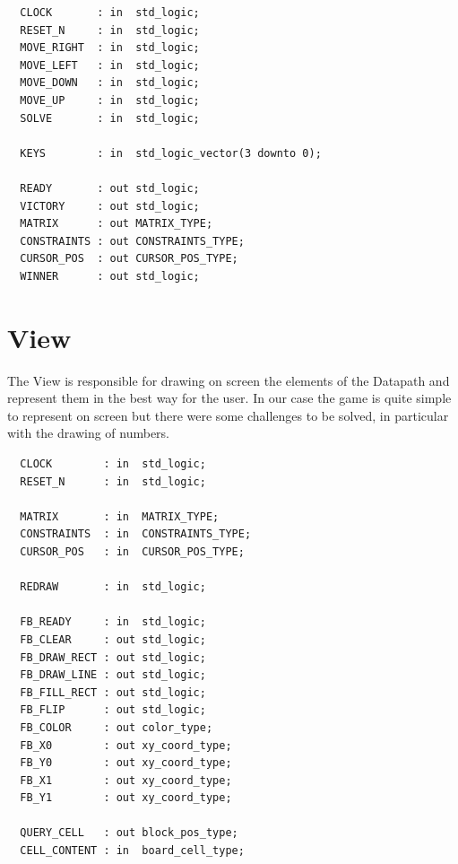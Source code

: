 \documentclass[12pt]{report}
\begin{document}
\begin{center}
\begin{minipage}{0.5\textwidth}
\begin{verbatim}
  CLOCK       : in  std_logic;
  RESET_N     : in  std_logic;
  MOVE_RIGHT  : in  std_logic;
  MOVE_LEFT   : in  std_logic;
  MOVE_DOWN   : in  std_logic;
  MOVE_UP     : in  std_logic;
  SOLVE       : in  std_logic;

  KEYS        : in  std_logic_vector(3 downto 0);

  READY       : out std_logic;
  VICTORY     : out std_logic;
  MATRIX      : out MATRIX_TYPE;
  CONSTRAINTS : out CONSTRAINTS_TYPE;
  CURSOR_POS  : out CURSOR_POS_TYPE;
  WINNER      : out std_logic;
\end{verbatim}
\end{minipage}
\end{center}

\newpage

\section*{View}

The View is responsible for drawing on screen the elements of the Datapath
and represent them in the best way for the user. In our case the game is
quite simple to represent on screen but there were some challenges to be
solved, in particular with the drawing of numbers.

\begin{center}
\begin{minipage}{0.5\textwidth}
\begin{verbatim}
  CLOCK        : in  std_logic;
  RESET_N      : in  std_logic;

  MATRIX       : in  MATRIX_TYPE;
  CONSTRAINTS  : in  CONSTRAINTS_TYPE;
  CURSOR_POS   : in  CURSOR_POS_TYPE;

  REDRAW       : in  std_logic;

  FB_READY     : in  std_logic;
  FB_CLEAR     : out std_logic;
  FB_DRAW_RECT : out std_logic;
  FB_DRAW_LINE : out std_logic;
  FB_FILL_RECT : out std_logic;
  FB_FLIP      : out std_logic;
  FB_COLOR     : out color_type;
  FB_X0        : out xy_coord_type;
  FB_Y0        : out xy_coord_type;
  FB_X1        : out xy_coord_type;
  FB_Y1        : out xy_coord_type;

  QUERY_CELL   : out block_pos_type;
  CELL_CONTENT : in  board_cell_type;
\end{verbatim}
\end{minipage}
\end{center}
\end{document}
